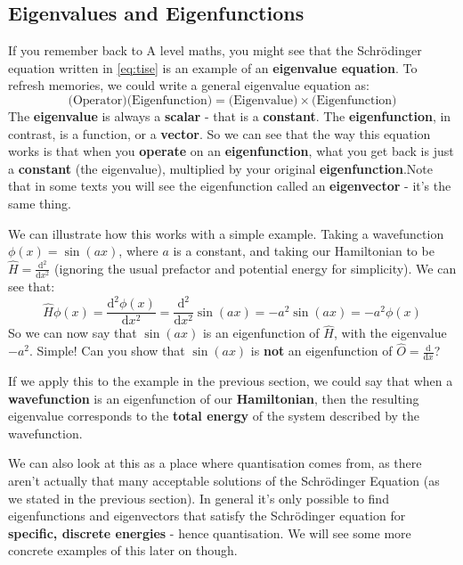 \documentclass{memoir}[11pt,oneside,a4paper,openany]
\begin{document}
\subsection{Eigenvalues and Eigenfunctions}
If you remember back to A level maths, you might see that the Schr{\"o}dinger equation written in \autoref{eq:tise} is an example of an \textbf{eigenvalue equation}. To refresh memories, we could write a general eigenvalue equation as:
\begin{equation}
	\text{(Operator)(Eigenfunction)} = \text{(Eigenvalue)}\times\text{(Eigenfunction)}
\end{equation}
The \textbf{eigenvalue} is always a \textbf{scalar} - that is a \textbf{constant}. The \textbf{eigenfunction}, in contrast, is a function, or a \textbf{vector}. So we can see that the way this equation works is that when you \textbf{operate} on an \textbf{eigenfunction}, what you get back is just a \textbf{constant} (the eigenvalue), multiplied by your original \textbf{eigenfunction}.Note that in some texts you will see the eigenfunction called an \textbf{eigenvector} - it's the same thing.  

We can illustrate how this works with a simple example. Taking a wavefunction $\phi(x) = \sin(ax)$, where $a$ is a constant, and taking our Hamiltonian to be $\hat{H} = \frac{\mathrm{d}^2}{\mathrm{d}x^2}$ (ignoring the usual prefactor and potential energy for simplicity). We can see that:
\begin{equation}
	\hat{H}\phi(x) = \frac{\mathrm{d}^2\phi(x)}{\mathrm{d}x^2} = \frac{\mathrm{d}^2}{\mathrm{d}x^2} \sin(ax) = -a^2 \sin(ax) = -a^2\phi(x)
\end{equation}
So we can now say that $\sin(ax)$ is an eigenfunction of $\hat{H}$, with the eigenvalue $-a^2$. Simple! Can you show that $\sin(ax)$ is \textbf{not} an eigenfunction of $\hat{O} = \frac{\mathrm{d}}{\mathrm{d}x}$? 

If we apply this to the example in the previous section, we could say that when a \textbf{wavefunction} is an eigenfunction of our \textbf{Hamiltonian}, then the resulting eigenvalue corresponds to the \textbf{total energy} of the system described by the wavefunction. 

We can also look at this as a place where quantisation comes from, as there aren't actually that many acceptable solutions of the Schr{\"o}dinger Equation (as we stated in the previous section). In general it's only possible to find eigenfunctions and eigenvectors that satisfy the Schr{\"o}dinger equation for \textbf{specific, discrete energies} - hence quantisation. We will see some more concrete examples of this later on though. 
\end{document}
